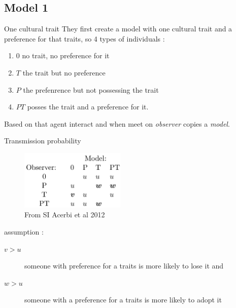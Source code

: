 \documentclass{beamer}
\begin{document}
\subsection{Model 1}
\begin{frame}{One cultural trait}
    They first create a model with one cultural trait and a preference for that traits, so 4 types of individuals :
    \begin{enumerate}
	\item $0$ no trait, no preference for it
	\item $T$ the trait but no preference
	\item $P$ the prefenrence but not possessing the trait
	\item $PT$ posses the trait and a preference for it.
    \end{enumerate}
    Based on that agent interact and when meet on \emph{observer} copies a \emph{model}.
\end{frame}
\begin{frame}{Transmission probability}
    \begin{figure}
	\center
	\includegraphics[width=5cm]{table_s1.png}
	\caption{From SI Acerbi et al 2012}
    \end{figure}

    assumption :
    \begin{description}
	\item[$v>u$]someone with preference for a traits is more likely to lose it and 
	\item[$w>u$]someone with a preference for a traits is more likely to adopt it
    \end{description}
    
\end{frame}
\end{document}
